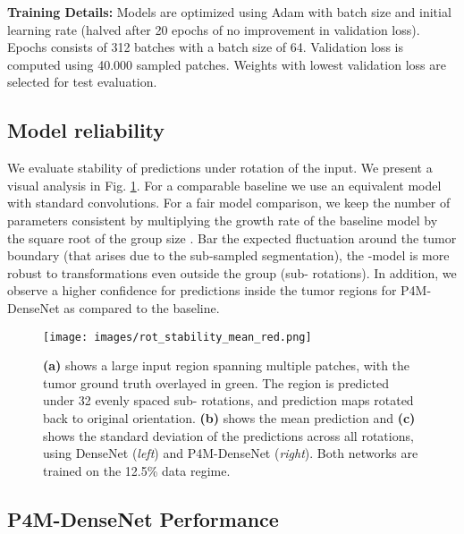 \documentclass{llncs}
\begin{document}
\textbf{Training Details:} Models are optimized using Adam\cite{Kingma2014-ll} with batch size  and initial learning rate  (halved after 20 epochs of no improvement in validation loss). Epochs consists of 312 batches with a batch size of 64. Validation loss is computed using 40.000 sampled patches. Weights with lowest validation loss are selected for test evaluation. 
















\subsection{Model reliability}
We evaluate stability of predictions under rotation of the input. We present a visual analysis in Fig. \ref{fig:rotstable}. For a comparable baseline we use an equivalent model with standard convolutions. For a fair model comparison, we keep the number of parameters consistent by multiplying the growth rate of the baseline model by the square root of the group size \cite{Cohen2016-do}. 
Bar the expected fluctuation around the tumor boundary (that arises due to the sub-sampled segmentation), the -model is more robust to transformations even outside the group (sub- rotations). In addition, we observe a higher confidence for predictions inside the tumor regions for P4M-DenseNet as compared to the baseline.



\begin{figure}[t]
\texttt{[image: images/rot\_stability\_mean\_red.png]}
\caption{\textbf{(a)} shows a large input region spanning multiple patches, with the tumor ground truth overlayed in green. The region is predicted under 32 evenly spaced sub- rotations, and prediction maps rotated back to original orientation. \textbf{(b)} shows the mean prediction and \textbf{(c)} shows the standard deviation of the predictions across all rotations, using DenseNet (\textit{left}) and P4M-DenseNet (\textit{right}). Both networks are trained on the 12.5\% data regime. }\label{fig:rotstable}
\end{figure}

\subsection{P4M-DenseNet Performance}
\vspace{-.5cm}
\end{document}
